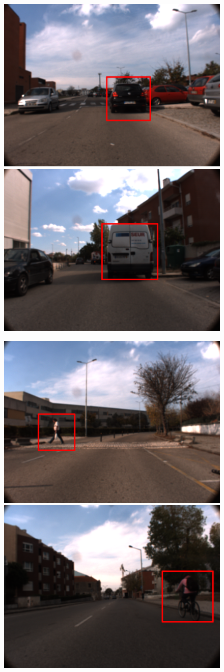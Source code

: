 \begin{figure}[htp]
	
	\centering
	
	\includegraphics[width=.49\textwidth]{capresults/imgs/car3.png}
	\includegraphics[width=.49\textwidth]{capresults/imgs/van3.png}
	
	\includegraphics[width=.49\textwidth]{capresults/imgs/people3.png}
	\includegraphics[width=.49\textwidth]{capresults/imgs/bicycle3.png}
	

\end{figure}
